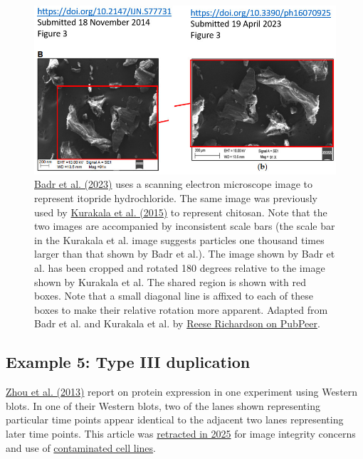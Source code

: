 \documentclass[letterpaper, 12pt]{article}
\begin{document}
\begin{figure}[h!tbp]
    \centering
    \includegraphics[width=\textwidth]{img/image_duplication/image-1741998932949.jpg}
    \caption*{\href{https://doi.org/10.3390/ph16070925}{Badr et al. (2023)} uses a scanning electron microscope image to represent itopride hydrochloride. The same image was previously used by \href{https://doi.org/10.2147/ijn.s77731}{Kurakala et al. (2015)} to represent chitosan. Note that the two images are accompanied by inconsistent scale bars (the scale bar in the Kurakala et al. image suggests particles one thousand times larger than that shown by Badr et al.). The image shown by Badr et al. has been cropped and rotated 180 degrees relative to the image shown by Kurakala et al. The shared region is shown with red boxes. Note that a small diagonal line is affixed to each of these boxes to make their relative rotation more apparent. Adapted from Badr et al. and Kurakala et al. by \href{https://pubpeer.com/publications/30DDCFCF4925C0DD401AA9810AC0A3}{Reese Richardson on PubPeer}.}
\end{figure}

\pagebreak

\subsection*{Example 5: Type III duplication}

\href{https://doi.org/10.1371/journal.pone.0058855}{Zhou et al. (2013)} report on protein expression in one experiment using Western blots. In one of their Western blots, two of the lanes shown representing particular time points appear identical to the adjacent two lanes representing later time points. This article was \href{https://doi.org/10.1371/journal.pone.0322907}{retracted in 2025} for image integrity concerns and use of \href{https://osf.io/d7we5}{contaminated cell lines}.
\end{document}
